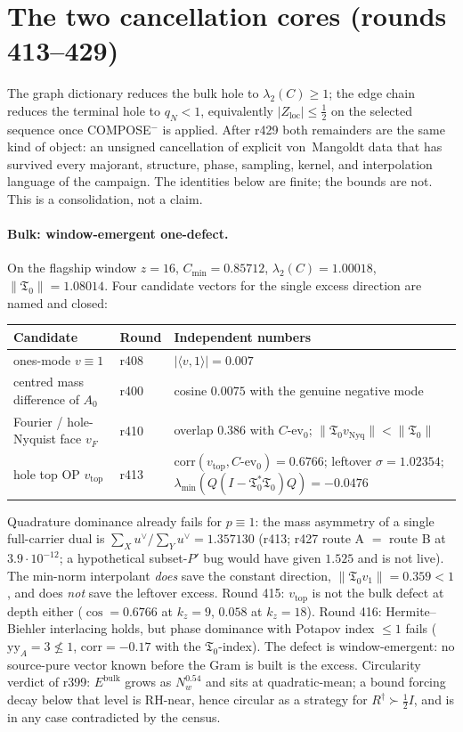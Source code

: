 \documentclass[11pt]{article}
\theoremstyle{remark}
\newcommand{\Rd}{R^{\dagger}}
\newcommand{\half}{\tfrac12}
\newcommand{\Tfrak}{\mathfrak{T}}
\newcommand{\Zloc}{Z_{\mathrm{loc}}}
\begin{document}
\section{The two cancellation cores (rounds 413--429)}
\label{sec:cores}

The graph dictionary reduces the bulk hole to
$\lambda_{2}(C)\ge1$; the edge chain reduces the terminal hole
to $q_{N}<1$, equivalently $|\Zloc|\le\half$ on the selected
sequence once COMPOSE$^{-}$ is applied.  After r429 both
remainders are the same kind of object: an unsigned
cancellation of explicit von~Mangoldt data that has survived
every majorant, structure, phase, sampling, kernel, and
interpolation language of the campaign.  The identities below
are finite; the bounds are not.  This is a consolidation, not
a claim.

\paragraph{Bulk: window-emergent one-defect.}
On the flagship window $z=16$,
$C_{\min}=0.85712$, $\lambda_{2}(C)=1.00018$,
$\|\Tfrak_{0}\|=1.08014$.  Four candidate vectors for the
single excess direction are named and closed:
\begin{center}
\small
\begin{tabular}{@{}llp{6.4cm}@{}}
\toprule
Candidate & Round & Independent numbers \\
\midrule
ones-mode $v\equiv 1$
  & r408 & $|\langle v,1\rangle|=0.007$ \\
centred mass difference of $A_{0}$
  & r400 & cosine $0.0075$ with the genuine negative mode \\
Fourier / hole-Nyquist face $v_{F}$
  & r410 & overlap $0.386$ with $C$-ev$_{0}$;
           $\|\Tfrak_{0}v_{\mathrm{Nyq}}\|<\|\Tfrak_{0}\|$ \\
hole top OP $v_{\mathrm{top}}$
  & r413 & $\mathrm{corr}(v_{\mathrm{top}},C\text{-ev}_{0})=0.6766$;
           leftover $\sigma=1.02354$;
           $\lambda_{\min}(Q(I-\Tfrak_{0}^{*}\Tfrak_{0})Q)=-0.0476$ \\
\bottomrule
\end{tabular}
\end{center}
Quadrature dominance already fails for $p\equiv1$: the mass
asymmetry of a single full-carrier dual is
$\sum_{X}u^{\vee}/\sum_{Y}u^{\vee}=1.357130$
(r413; r427 route A $=$ route B at $3.9\cdot10^{-12}$; a
hypothetical subset-$P'$ bug would have given $1.525$ and is
not live).  The min-norm interpolant \emph{does} save the
constant direction, $\|\Tfrak_{0}v_{1}\|=0.359<1$, and does
\emph{not} save the leftover excess.  Round 415: $v_{\mathrm{top}}$
is not the bulk defect at depth either
($\cos=0.6766$ at $k_{z}=9$, $0.058$ at $k_{z}=18$).
Round 416: Hermite--Biehler interlacing holds, but phase
dominance with Potapov index $\le1$ fails
($\mathrm{yy}_{A}=3\not\le1$, $\mathrm{corr}=-0.17$ with the
$\Tfrak_{0}$-index).  The defect is window-emergent: no
source-pure vector known before the Gram is built is the
excess.  Circularity verdict of r399: $E^{\mathrm{bulk}}$
grows as $N_{w}^{0.54}$ and sits at quadratic-mean; a bound
forcing decay below that level is RH-near, hence circular as a
strategy for $\Rd\succ\half I$, and is in any case contradicted
by the census.
\end{document}
